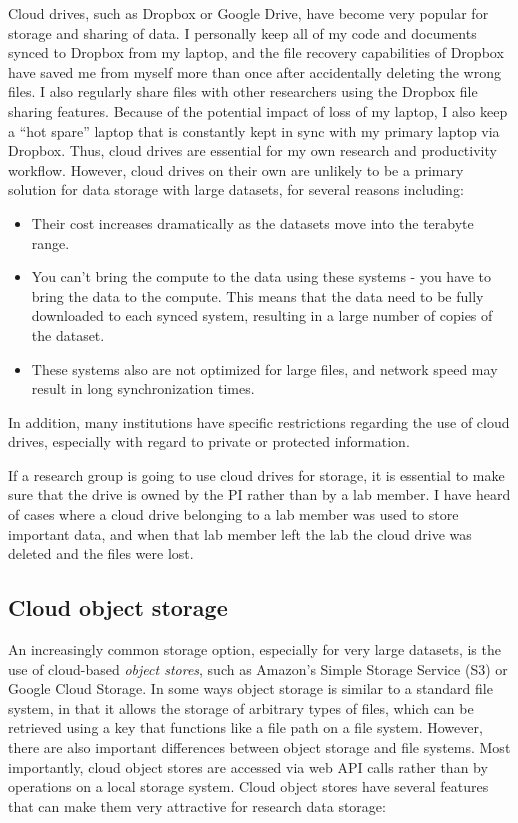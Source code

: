 Cloud drives, such as Dropbox or Google Drive, have become very popular for storage and sharing of data.  I personally keep all of my code and documents synced to Dropbox from my laptop, and the file recovery capabilities of Dropbox have saved me from myself more than once after accidentally deleting the wrong files.  I also regularly share files with other researchers using the Dropbox file sharing features.  Because of the potential impact of loss of my laptop, I also keep a ``hot spare'' laptop that is constantly kept in sync with my primary laptop via Dropbox.  Thus, cloud drives are essential for my own research and productivity workflow. However, cloud drives on their own are unlikely to be a primary solution for data storage with large datasets, for several reasons including:

\begin{itemize}
\item Their cost increases dramatically as the datasets move into the terabyte range.
\item You can't bring the compute to the data using these systems - you have to bring the data to the compute.  This means that the data need to be fully downloaded to each synced system, resulting in a large number of copies of the dataset.
\item These systems also are not optimized for large files, and network speed may result in long synchronization times.
\end{itemize}

In addition, many institutions have specific restrictions regarding the use of cloud drives, especially with regard to private or protected information.

If a research group is going to use cloud drives for storage, it is essential to make sure that the drive is owned by the PI rather than by a lab member. I have heard of cases where a cloud drive belonging to a lab member was used to store important data, and when that lab member left the lab the cloud drive was deleted and the files were lost.

\subsection{Cloud object storage}

An increasingly common storage option, especially for very large datasets, is the use of cloud-based \textit{object stores}, such as Amazon's Simple Storage Service (S3) or Google Cloud Storage.  In some ways object storage is similar to a standard file system, in that it allows the storage of arbitrary types of files, which can be retrieved using a key that functions like a file path on a file system.  However, there are also important differences between object storage and file systems. Most importantly, cloud object stores are accessed via web API calls rather than by operations on a local storage system.  Cloud object stores have several features that can make them very attractive for research data storage:

